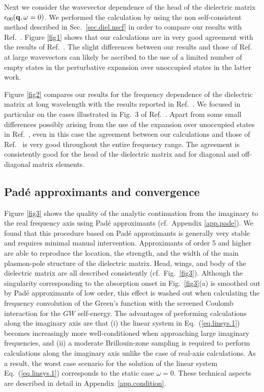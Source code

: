 \documentclass[twocolumn,prb,showpacs,superscriptaddress]{revtex4}
\def\w{\omega}
\def\q{{\bf q}}
\begin{document}
Next we consider the wavevector dependence of the head of the
dielectric matrix $\epsilon_{00}(\q,\w=0)$. We performed the
calculation by using the non self-consistent method described in
Sec.\ \ref{sec.diel.nscf} in order to compare our results with Ref.\ .
Figure \ref{fig1} shows that our calculations are in very good agreement with the results
of Ref.\ . The slight differences between our results and those
of Ref.~ at large wavevectors can likely be ascribed to the use of a limited 
number of empty states in the perturbative expansion over unoccupied states in the latter work.

Figure \ref{fig2} compares our results for the frequency dependence of the dielectric matrix
at long wavelength with the results reported in Ref.\ . 
We focused in particular on the cases illustrated in Fig.\ 3 of Ref.\ .
Apart from some small differences possibly arising from the use of the expansion over unoccupied
states in Ref.\ , even in this case the agreement between our calculations 
and those of Ref.\  is very good throughout the entire frequency range.
The agreement is consistently good for the head of the dielectric matrix and for
diagonal and off-diagonal matrix elements.

\subsection{Pad\'e approximants and convergence}\label{sec.conv}

Figure \ref{fig3} shows the quality of the analytic continuation from the imaginary to
the real frequency axis using Pad\'e approximants (cf.\ Appendix \ref{app.pade}).\cite{pade1,pade2} We found that this procedure based on 
Pad\'e approximants is generally very stable and requires minimal manual intervention.
Approximants of order 5 and higher are able to reproduce the location, the strength, and the width of
the main plasmon-pole structure of the dielectric matrix. Head, wings, and body of the
dielectric matrix are all described consistently (cf.\ Fig.\ \ref{fig3}). Although the singularity
corresponding to the absorption onset in Fig.\ \ref{fig3}(a) is smoothed out by 
Pad\'e approximants of low order, this effect
is washed out when calculating the frequency convolution of the Green's function with
the screened Coulomb interaction for the $GW$ self-energy.
The advantages of performing calculations along the imaginary axis are that (i) the 
linear system in Eq.\ (\ref{eq.linsys.1}) becomes increasingly more well-conditioned
when approaching large imaginary frequencies, and (ii) a moderate Brillouin-zone sampling is
required to perform calculations along the imaginary axis unlike the case of real-axis
calculations. As a result, the worst case scenario for the solution
of the linear system Eq.\ (\ref{eq.linsys.1}) corresponds to the static case $\w=0$.
These technical aspects are described in detail in Appendix~\ref{app.condition}.
\end{document}
